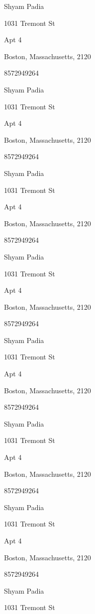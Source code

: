 \documentclass[a4paper]{article}
\begin{document}
\begin{multicols}{2}
\begin{framed}
Shyam Padia\par
1031 Tremont St\par
Apt 4\par
Boston, Massachusetts, 2120\par
8572949264
\end{framed}
\begin{framed}
Shyam Padia\par
1031 Tremont St\par
Apt 4\par
Boston, Massachusetts, 2120\par
8572949264
\end{framed}
\begin{framed}
Shyam Padia\par
1031 Tremont St\par
Apt 4\par
Boston, Massachusetts, 2120\par
8572949264
\end{framed}
\begin{framed}
Shyam Padia\par
1031 Tremont St\par
Apt 4\par
Boston, Massachusetts, 2120\par
8572949264
\end{framed}
\begin{framed}
Shyam Padia\par
1031 Tremont St\par
Apt 4\par
Boston, Massachusetts, 2120\par
8572949264
\end{framed}
\begin{framed}
Shyam Padia\par
1031 Tremont St\par
Apt 4\par
Boston, Massachusetts, 2120\par
8572949264
\end{framed}
\begin{framed}
Shyam Padia\par
1031 Tremont St\par
Apt 4\par
Boston, Massachusetts, 2120\par
8572949264
\end{framed}
\begin{framed}
Shyam Padia\par
1031 Tremont St\par

\end{framed}
\end{multicols}
\end{document}
